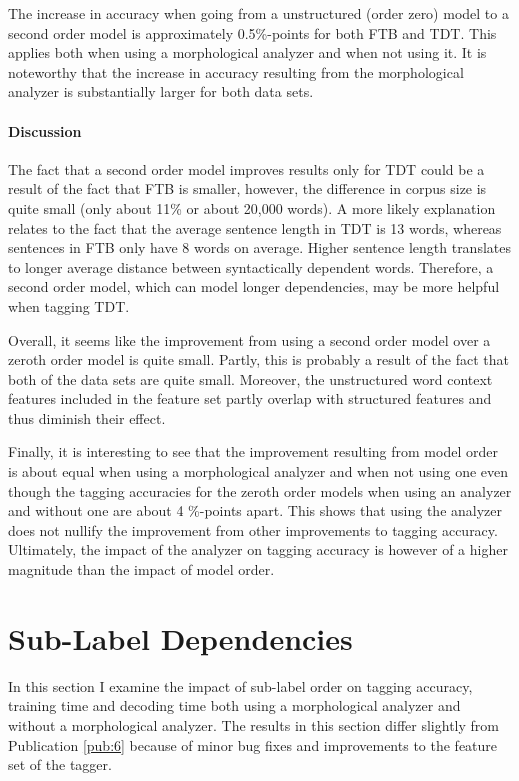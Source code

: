 The increase in accuracy when going from a unstructured (order zero)
model to a second order model is approximately 0.5\%-points for both
FTB and TDT. This applies both when using a morphological analyzer and
when not using it. It is noteworthy that the increase in accuracy
resulting from the morphological analyzer is substantially larger for
both data sets.

\paragraph{Discussion} The fact that a second order model improves
results only for TDT could be a result of the fact that FTB is
smaller, however, the difference in corpus size is quite small (only about
11\% or about 20,000 words). A more likely explanation relates to the
fact that the average sentence length in TDT is 13 words, whereas
sentences in FTB only have 8 words on average. Higher sentence length
translates to longer average distance between syntactically
dependent words. Therefore, a second order model, which can model longer
dependencies, may be more helpful when tagging TDT.

Overall, it seems like the improvement from using a second order model
over a zeroth order model is quite small. Partly, this is probably a
result of the fact that both of the data sets are quite
small. Moreover, the unstructured word context features included in
the feature set partly overlap with structured features and thus
diminish their effect.

Finally, it is interesting to see that the improvement resulting from
model order is about equal when using a morphological analyzer and
when not using one even though the tagging accuracies for the zeroth
order models when using an analyzer and without one are about 4
\%-points apart. This shows that using the analyzer does not nullify
the improvement from other improvements to tagging accuracy. Ultimately,
the impact of the analyzer on tagging accuracy is however of a
higher magnitude than the impact of model order.
 
\section{Sub-Label Dependencies}

In this section I examine the impact of sub-label order on
tagging accuracy, training time and decoding time both using a
morphological analyzer and without a morphological analyzer. The
results in this section differ slightly from Publication \ref{pub:6}
because of minor bug fixes and improvements to the feature set of the
tagger.

